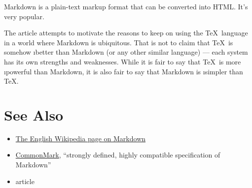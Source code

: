 
Markdown is a plain-text markup format that can be converted into HTML. It’s
very popular.

The article  attempts to motivate the reasons to keep on using
the \TeX\ language in a world where Markdown is ubiquitous. That is not to claim
that \TeX\ is somehow \i{better} than Markdown (or any other similar language) —
each system has its own strengths and weaknesses. While it is fair to say that
\TeX\ is more \i{powerful} than Markdown, it is also fair to say that Markdown
is \i{simpler} than \TeX.

\section*{See Also}

\begin{itemize}
\item \href{https://en.wikipedia.org/wiki/Markdown}{The English Wikipedia page on Markdown}
\item \href{https://commonmark.org/}{CommonMark}, “strongly defined, highly
  compatible specification of Markdown”
\item {} article
\end{itemize}
